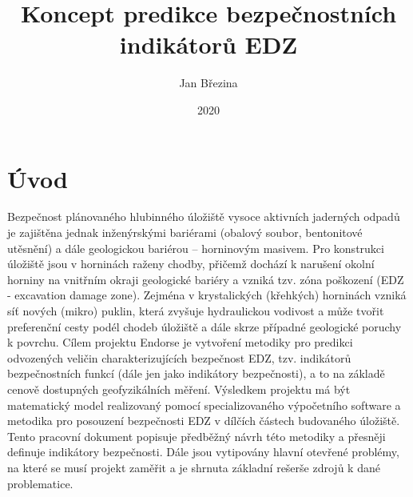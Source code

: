 \documentclass{article}
\title{Koncept predikce bezpečnostních indikátorů EDZ}
\author{Jan Březina}
\date{2020}
\begin{document}
\maketitle


\section{Úvod}
Bezpečnost plánovaného hlubinného úložiště vysoce aktivních jaderných odpadů je zajištěna 
jednak inženýrskými bariérami (obalový soubor, bentonitové utěsnění) a dále geologickou bariérou 
– horninovým masivem. Pro konstrukci úložiště jsou v horninách raženy chodby, přičemž dochází 
k narušení okolní horniny na vnitřním okraji geologické bariéry a vzniká tzv. zóna poškození 
(EDZ - excavation damage zone). 
Zejména v krystalických (křehkých) horninách vzniká síť nových (mikro) puklin, která zvyšuje 
hydraulickou vodivost a může tvořit preferenční cesty podél 
chodeb úložiště a dále skrze případné geologické poruchy k povrchu.
Cílem projektu Endorse je vytvoření metodiky pro predikci odvozených veličin charakterizujících 
bezpečnost EDZ, tzv. indikátorů bezpečnostních funkcí (dále jen jako indikátory bezpečnosti), 
a to na základě cenově dostupných geofyzikálních měření. Výsledkem projektu má být matematický 
model realizovaný pomocí specializovaného výpočetního software a metodika pro posouzení 
bezpečnosti EDZ v dílčích částech budovaného úložiště.
Tento pracovní dokument popisuje předběžný návrh této metodiky a přesněji definuje indikátory 
bezpečnosti. Dále jsou vytipovány hlavní otevřené problémy, na které se musí projekt zaměřit a je 
shrnuta základní rešerše zdrojů k dané problematice. 
\end{document}
